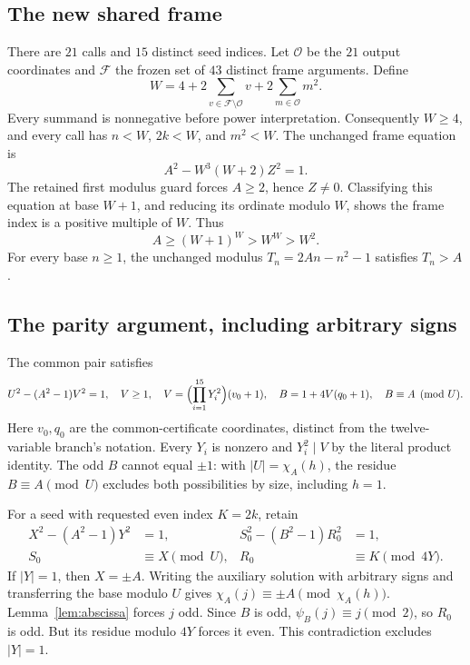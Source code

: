 \documentclass[11pt]{article}
\theoremstyle{definition}\newtheorem{definition}[theorem]{Definition}
\theoremstyle{remark}\newtheorem{remark}[theorem]{Remark}
\begin{document}
\subsection{The new shared frame}
There are $21$ calls and $15$ distinct seed indices. Let $\mathcal O$
be the $21$ output coordinates and $\mathcal F$ the frozen set of $43$
distinct frame arguments. Define
\begin{equation}\label{eq:frame}
 W=4+2\sum_{v\in\mathcal F\setminus\mathcal O}v
       +2\sum_{m\in\mathcal O}m^2.
\end{equation}
Every summand is nonnegative before power interpretation. Consequently
$W\ge4$, and every call has $n<W$, $2k<W$, and $m^2<W$.
The unchanged frame equation is
\[
 A^2-W^3(W+2)Z^2=1.
\]
The retained first modulus guard forces $A\ge2$, hence $Z\ne0$.
Classifying this equation at base $W+1$, and reducing its ordinate
modulo $W$, shows the frame index is a positive multiple of $W$.
Thus
\begin{equation}\label{eq:framebound}
 A\ge(W+1)^W>W^W>W^2.
\end{equation}
For every base $n\ge1$, the unchanged modulus
$T_n=2An-n^2-1$ satisfies $T_n>A$.

\subsection{The parity argument, including arbitrary signs}
The common pair satisfies
\begin{equation}\label{eq:common}
 U^2-(A^2-1)V^2=1,\quad V\ge1,\quad
 V=\Bigl(\prod_{i=1}^{15}Y_i^2\Bigr)(v_0+1),\quad
 B=1+4V(q_0+1),\quad B\equiv A\pmod U.
\end{equation}
Here $v_0,q_0$ are the common-certificate coordinates, distinct from the
twelve-variable branch's notation. Every $Y_i$ is nonzero and $Y_i^2\mid V$
by the literal product identity. The odd $B$ cannot equal $\pm1$:
with $|U|=\chi_A(h)$, the residue $B\equiv A\pmod U$ excludes both
possibilities by size, including $h=1$.

For a seed with requested even index $K=2k$, retain
\begin{align}
 X^2-(A^2-1)Y^2&=1,& S_0^2-(B^2-1)R_0^2&=1,\\
 S_0&\equiv X\pmod U,&R_0&\equiv K\pmod{4Y}.
\end{align}
If $|Y|=1$, then $X=\pm A$. Writing the auxiliary solution with
arbitrary signs and transferring the base modulo $U$ gives
$\chi_A(j)\equiv\pm A\pmod{\chi_A(h)}$. Lemma~\ref{lem:abscissa}
forces $j$ odd. Since $B$ is odd, $\psi_B(j)\equiv j\pmod2$, so $R_0$
is odd. But its residue modulo $4Y$ forces it even. This contradiction
excludes $|Y|=1$.
\end{document}
